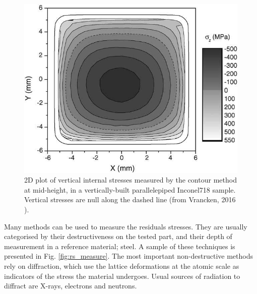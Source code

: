 \begin{figure}[ht]
	\centering
	\includegraphics[scale=0.50]{Images/rs_section}
	\decoRule
	\caption[2D plot of vertical internal stresses measured by the contour method at mid-height, in a vertically-built parallelipiped Inconel718 sample. Vertical stresses are null along the dashed line.]{2D plot of vertical internal stresses measured by the contour method at mid-height, in a vertically-built parallelepiped Inconel718 sample. Vertical stresses are null along the dashed line (from Vrancken, 2016 \parencite{Vrancken2016}).}
	\label{fig:rs_section}
\end{figure}

Many methods can be used to measure the residuals stresses. They are usually categorised by their destructiveness on the tested part, and their depth of measurement in a reference material; steel. A sample of these techniques is presented in Fig. \ref{fig:rs_measure}. The most important non-destructive methods rely on diffraction, which use the lattice deformations at the atomic scale as indicators of the stress the material undergoes. Usual sources of radiation to diffract are X-rays, electrons and neutrons.\\

